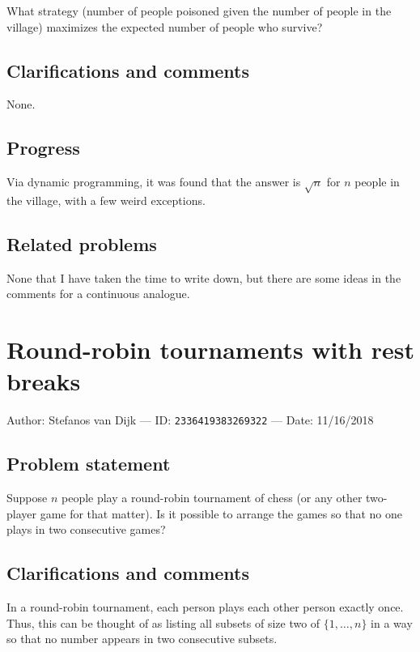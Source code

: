 \documentclass[10pt]{article}
\begin{document}
What strategy (number of people poisoned given the number of people in the village) maximizes the expected number of people who survive?

\subsection{Clarifications and comments}

None.

\subsection{Progress}

Via dynamic programming, it was found that the answer is $\sqrt{n}$ for $n$ people in the village, with a few weird exceptions.

\subsection{Related problems}

None that I have taken the time to write down, but there are some ideas in the comments for a continuous analogue.

\pagebreak

\section{Round-robin tournaments with rest breaks}

Author: Stefanos van Dijk --- ID: \verb`2336419383269322` --- Date: 11/16/2018

\subsection{Problem statement}

Suppose $n$ people play a round-robin tournament of chess (or any other two-player game for that matter). Is it possible to arrange the games so that no one plays in two consecutive games?

\subsection{Clarifications and comments}

In a round-robin tournament, each person plays each other person exactly once. Thus, this can be thought of as listing all subsets of size two of $\{1,\ldots,n\}$ in a way so that no number appears in two consecutive subsets.
\end{document}
